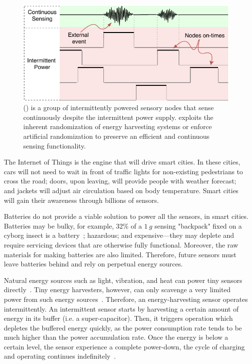 \begin{figure}
	\centering
	\includegraphics[width=\columnwidth]{figures/coalInterSen}
	\caption{\fullsys (\sys) is a group of intermittently powered sensory nodes that sense continuously despite the intermittent power supply. \sys exploits the inherent randomization of energy harvesting systems or enforce artificial randomization to preserve an efficient and continuous sensing functionality.}
	\label{fig:powerCycle}
\end{figure}

The Internet of Things is the engine that will drive smart cities. In these cities, cars will not need to wait in front of traffic lights for non-existing pedestrians to cross the road; doors, upon leaving, will provide people with weather forecast; and jackets will adjust air circulation based on body temperature. Smart cities will gain their awareness through billions of sensors.

Batteries do not provide a viable solution to power all the sensors, in smart cities. Batteries may be bulky, for example, 32\% of a $\SI{1}{g}$ sensing "backpack" fixed on a cyborg insect is a battery~\cite{daly2010pulsed}; hazardous; and expensive---they may deplete and require servicing devices that are otherwise fully functional. Moreover, the raw materials for making batteries are also limited. Therefore, future sensors must leave batteries behind and rely on perpetual energy sources. 

Natural energy sources such as light, vibration, and heat can power tiny sensors directly~\cite{margolies2016panda, gorlatova2014movers, gorlatova2010energy, gollakota2014emergence,}. Tiny energy harvesters, however, can only scavenge a very limited power from such energy sources~\cite{liu2013ambient}. Therefore, an energy-harvesting sensor operates intermittently. An intermittent sensor starts by harvesting a certain amount of energy in its buffer (i.e. a super-capacitor). Then, it triggers operation which depletes the buffered energy quickly, as the power consumption rate tends to be much higher than the power accumulation rate. Once the energy is below a certain level, the sensor experience a complete power-down, the cycle of charging and operating continues indefinitely~\cite{colin2018reconfigurable}.

